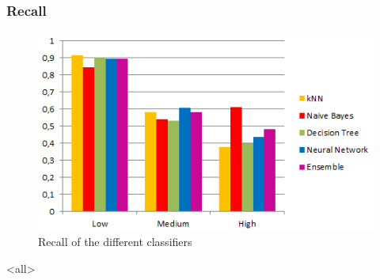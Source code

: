 \begin{frame}
	\begin{table}[h]
		\centering
		\caption{Confusion matrix of the ensemble}
		\label{tab:mat-vote}
	\end{table}
\end{frame}


\begin{frame}
	\frametitle{Recall}	
	\begin{figure}[h]
		\centering
		\includegraphics[width=0.7\columnwidth]{../../charts/recall.png}
		\caption{Recall of the different classifiers}
		\label{fig:recall}
	\end{figure}
\end{frame}
\mode<all>